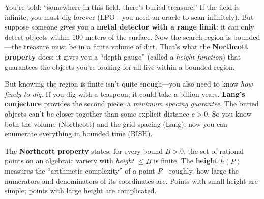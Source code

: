 \documentclass[11pt,twoside,openany]{report}
\theoremstyle{remark}
\newcommand{\BISH}{\textsf{BISH}}
\newcommand{\LPO}{\textsf{LPO}}
\begin{document}
\begin{analogybox}
You're told: ``somewhere in this field, there's buried treasure.'' If the field is infinite, you must dig forever (\LPO---you need an oracle to scan infinitely). But suppose someone gives you a \textbf{metal detector with a range limit}: it can only detect objects within 100 meters of the surface. Now the search region is bounded---the treasure must be in a finite volume of dirt. That's what the \textbf{Northcott property} does: it gives you a ``depth gauge'' (called a \emph{height function}) that guarantees the objects you're looking for all live within a bounded region.

But knowing the region is finite isn't quite enough---you also need to know \emph{how finely to dig}. If you dig with a teaspoon, it could take a billion years. \textbf{Lang's conjecture} provides the second piece: a \emph{minimum spacing guarantee}. The buried objects can't be closer together than some explicit distance $c > 0$. So you know both the volume (Northcott) and the grid spacing (Lang): now you can enumerate everything in bounded time (\BISH).
\end{analogybox}

The \textbf{Northcott property} states: for every bound $B > 0$, the set of rational points on an algebraic variety with \emph{height} $\leq B$ is finite. The \textbf{height} $\hat{h}(P)$ measures the ``arithmetic complexity'' of a point $P$---roughly, how large the numerators and denominators of its coordinates are. Points with small height are simple; points with large height are complicated.
\end{document}
